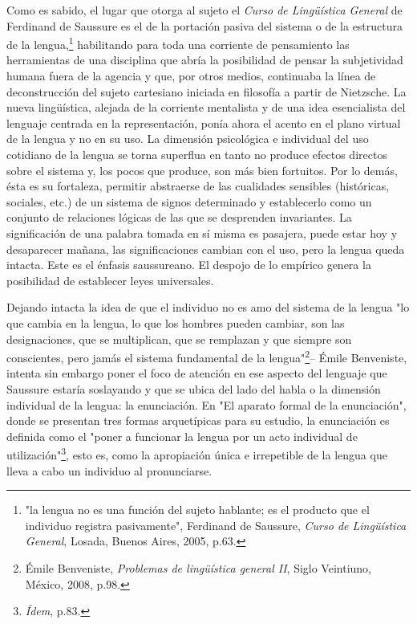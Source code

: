 \documentclass{book}
\begin{document}
Como es sabido, el lugar que otorga al sujeto el \emph{Curso de
Lingüística General} de Ferdinand de Saussure es el de la portación
pasiva del sistema o de la estructura de la lengua,\footnote{"la lengua
  no es una función del sujeto hablante; es el producto que el individuo
  registra pasivamente", Ferdinand de Saussure, \emph{Curso de
  Lingüística General}, Losada, Buenos Aires, 2005, p.63.} habilitando
para toda una corriente de pensamiento las herramientas de una
disciplina que abría la posibilidad de pensar la subjetividad humana
fuera de la agencia y que, por otros medios, continuaba la línea de
deconstrucción del sujeto cartesiano iniciada en filosofía a partir de
Nietzsche. La nueva lingüística, alejada de la corriente mentalista y de
una idea esencialista del lenguaje centrada en la representación, ponía
ahora el acento en el plano virtual de la lengua y no en su uso. La
dimensión psicológica e individual del uso cotidiano de la lengua se
torna superflua en tanto no produce efectos directos sobre el sistema y,
los pocos que produce, son más bien fortuitos. Por lo demás, ésta es su
fortaleza, permitir abstraerse de las cualidades sensibles (históricas,
sociales, etc.) de un sistema de signos determinado y establecerlo como
un conjunto de relaciones lógicas de las que se desprenden invariantes.
La significación de una palabra tomada en sí misma es pasajera, puede
estar hoy y desaparecer mañana, las significaciones cambian con el uso,
pero la lengua queda intacta. Este es el énfasis saussureano. El despojo
de lo empírico genera la posibilidad de establecer leyes universales.

Dejando intacta la idea de que el individuo no es amo del sistema de la
lengua "lo que cambia en la lengua, lo que los hombres pueden cambiar,
son las designaciones, que se multiplican, que se remplazan y que
siempre son conscientes, pero jamás el sistema fundamental de la
lengua"\footnote{Émile Benveniste, \emph{Problemas de lingüística
  general II}, Siglo Veintiuno, México, 2008, p.98.}-- Émile Benveniste,
intenta sin embargo poner el foco de atención en ese aspecto del
lenguaje que Saussure estaría soslayando y que se ubica del lado del
habla o la dimensión individual de la lengua: la enunciación. En "El
aparato formal de la enunciación", donde se presentan tres formas
arquetípicas para su estudio, la enunciación es definida como el "poner
a funcionar la lengua por un acto individual de utilización"\footnote{\emph{Ídem},
  p.83.}, esto es, como la apropiación única e irrepetible de la lengua
que lleva a cabo un individuo al pronunciarse.
\end{document}
